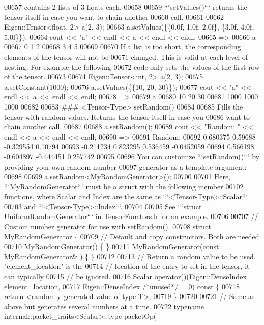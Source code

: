 \begin{DoxyCode}
00657 contains 2 lists of 3 floats each.
00658 
00659 ```setValues()``` returns the tensor itself in case you want to chain another
00660 call.
00661 
00662     Eigen::Tensor<float, 2> a(2, 3);
00663     a.setValues(\{\{0.0f, 1.0f, 2.0f\}, \{3.0f, 4.0f, 5.0f\}\});
00664     cout << "a" << endl << a << endl << endl;
00665     =>
00666     a
00667     0 1 2
00668     3 4 5
00669 
00670 If a list is too short, the corresponding elements of the tensor will not be
00671 changed.  This is valid at each level of nesting.  For example the following
00672 code only sets the values of the first row of the tensor.
00673 
00674     Eigen::Tensor<int, 2> a(2, 3);
00675     a.setConstant(1000);
00676     a.setValues(\{\{10, 20, 30\}\});
00677     cout << "a" << endl << a << endl << endl;
00678     =>
00679     a
00680     10   20   30
00681     1000 1000 1000
00682 
00683 ### <Tensor-Type> setRandom()
00684 
00685 Fills the tensor with random values.  Returns the tensor itself in case you
00686 want to chain another call.
00687 
00688     a.setRandom();
00689     cout << "Random: " << endl << a << endl << endl;
00690     =>
00691     Random:
00692       0.680375    0.59688  -0.329554    0.10794
00693      -0.211234   0.823295   0.536459 -0.0452059
00694       0.566198  -0.604897  -0.444451   0.257742
00695 
00696 You can customize ```setRandom()``` by providing your own random number
00697 generator as a template argument:
00698 
00699     a.setRandom<MyRandomGenerator>();
00700 
00701 Here, ```MyRandomGenerator``` must be a struct with the following member
00702 functions, where Scalar and Index are the same as ```<Tensor-Type>::Scalar```
00703 and ```<Tensor-Type>::Index```.
00704 
00705 See ```struct UniformRandomGenerator``` in TensorFunctors.h for an example.
00706 
00707     // Custom number generator for use with setRandom().
00708     struct MyRandomGenerator \{
00709       // Default and copy constructors. Both are needed
00710       MyRandomGenerator() \{ \}
00711       MyRandomGenerator(const MyRandomGenerator& ) \{ \}
00712 
00713       // Return a random value to be used.  "element\_location" is the
00714       // location of the entry to set in the tensor, it can typically
00715       // be ignored.
00716       Scalar operator()(Eigen::DenseIndex element\_location,
00717                         Eigen::DenseIndex /*unused*/ = 0) const \{
00718         return <randomly generated value of type T>;
00719       \}
00720 
00721       // Same as above but generates several numbers at a time.
00722       typename internal::packet\_traits<Scalar>::type packetOp(

\end{DoxyCode}
